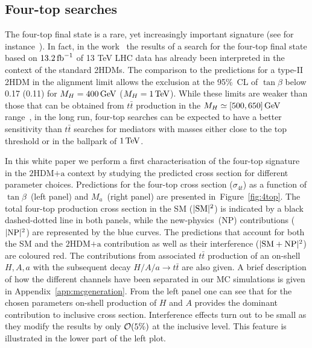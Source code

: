 \documentclass[a4paper, 11pt,notoc]{article}
\newcommand{\ma}{\ensuremath{M_{a}}\xspace}
\newcommand{\mH}{\ensuremath{M_{H}}\xspace}
\newcommand{\hdma}{\ensuremath{\textrm{2HDM+a}}\xspace}
\begin{document}
\subsection{Four-top searches}

The four-top final state is a rare, yet increasingly important signature (see for instance~\cite{ATLAS-CONF-2016-104,Sirunyan:2017roi,Aaboud:2018xuw,Hajer:2015gka,Gori:2016zto,Alvarez:2016nrz}).   In fact, in the work~\cite{ATLAS-CONF-2016-104} the results of a search for the four-top final state based on $13.2 \, {\rm fb}^{-1}$ of 13 TeV LHC data has already been interpreted in the context of the standard 2HDMs. The comparison to the predictions for a type-II 2HDM in the alignment limit allows the exclusion at the 95\%~CL of $\tan \beta$  below 0.17 (0.11) for $\mH = 400 \, {\rm GeV}$ ($\mH = 1 \, {\rm TeV}$). While these limits are weaker than those that can be obtained from $t \bar t$ production in the $M_{H} \simeq [500, 650] \, {\rm GeV}$ range~\cite{Aaboud:2017hnm}, in the long run, four-top searches can be expected to have a better sensitivity than $t \bar t$ searches for mediators with  masses either close to the top threshold or  in the ballpark of $1 \, {\rm TeV}$. 

 In this white paper we perform a first characterisation of the four-top signature in the \hdma context by studying the predicted cross section for different parameter choices. Predictions for the four-top cross section ($\sigma_{4t}$) as a function of $\tan \beta$~(left panel) and $\ma$~(right panel) are presented in~Figure~\ref{fig:4top}. The total four-top production cross section in the SM ($|{\rm SM}|^2$) is indicated by a black dashed-dotted line in both panels, while the new-physics~(NP) contributions ($|{\rm NP}|^2$) are represented by the blue curves. The predictions that account for both the SM and the \hdma contribution as well as  their interference ($|{\rm SM} + {\rm NP}|^2$) are coloured red. The contributions from associated $t \bar t$ production of an on-shell $H, A, a$ with the subsequent decay $H/A/a \to t \bar t$ are also given.  A brief description of how the different channels have been separated in our MC simulations  is given in Appendix~\ref{app:mcgeneration}. From the left panel one can see that for the chosen parameters on-shell production of $H$ and $A$ provides the dominant contribution to inclusive cross section. Interference effects turn out to be small as they modify the results  by only ${\cal O} (5\%)$ at the inclusive level. This feature is illustrated in the lower part of the left plot.
 
\end{document}
